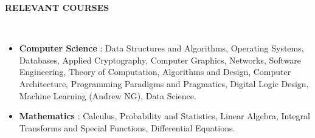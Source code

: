 \documentclass[a4paper,10pt]{article}
\newcommand{\lsep}{-0.6cm}
\newcommand{\resheading}[1]{{\small \colorbox{mygrey}{\begin{minipage}{0.975\textwidth}{\textbf{#1 \vphantom{p\^{E}}}}\end{minipage}}}}
\begin{document}
\resheading{\textbf{RELEVANT COURSES} }\\[\lsep]
\vspace{1.0pt}
\begin{itemize}[itemsep=0.1pt]
\item \noindent \textbf{Computer Science} : Data Structures and Algorithms, Operating Systems, Databases, Applied Cryptography, Computer Graphics, Networks, Software Engineering, Theory of Computation,  Algorithms and Design, Computer Architecture,
Programming Paradigms and Pragmatics, Digital Logic Design,
Machine Learning (Andrew NG), Data Science.
\item \noindent \textbf{Mathematics} : Calculus, Probability and Statistics, Linear Algebra, Integral Transforms
and Special Functions, Differential Equations.
\end{itemize}
\end{document}

